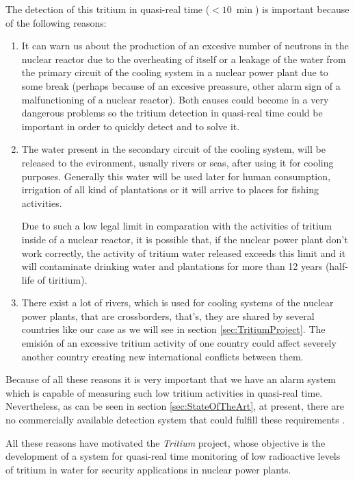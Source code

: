 The detection of this tritium in quasi-real time ($<10~\min$) is important because of the following reasons:

\begin{enumerate}

\item{} It can warn us about the production of an excesive number of neutrons in the nuclear reactor due to the overheating of itself or a leakage of the water from the primary circuit of the cooling system in a nuclear power plant due to some break (perhaps because of an excesive preassure, other alarm sign of a malfunctioning of a nuclear reactor). Both causes could become in a very dangerous problems so the tritium detection in quasi-real time could be important in order to quickly detect and to solve it.

\item{} The water present in the secondary circuit of the cooling system, will be released to the evironment, usually rivers or seas, after using it for cooling purposes. Generally this water will be used later for human consumption, irrigation of all kind of plantations or it will arrive to places for fishing activities. 

Due to such a low legal limit in comparation with the activities of tritium inside of a nuclear reactor, it is possible that, if the nuclear power plant don't work correctly, the activity of tritium water released exceeds this limit and it will contaminate drinking water and plantations for more than 12 years (half-life of tiritium).


\item{} There exist a lot of rivers, which is used for cooling systems of the nuclear power plants, that are crossborders, that's, they are shared by several countries like our case as we will see in section \ref{sec:TritiumProject}. The emisión of an excessive tritium activity of one country could affect severely another country creating new international conflicts between them.

\end{enumerate}

Because of all these reasons it is very important that we have an alarm system which is capable of measuring such low tritium activities in quasi-real time. Nevertheless, as can be seen in section \ref{sec:StateOfTheArt}, at present, there are no commercially available detection system that could fulfill these requirements .

All these reasons have motivated the \textit{Tritium} project, whose objective is the development of a system for quasi-real time monitoring of low radioactive levels of tritium in water for security applications in nuclear power plants.